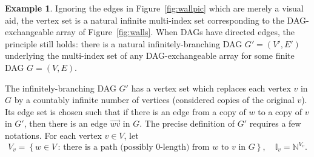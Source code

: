 \documentclass[10pt]{amsart}
\theoremstyle{definition}\newtheorem{defi}[theo]{Definition}\newtheorem{rema}[theo]{Remark}\newtheorem{exam}[theo]{Example}\newtheorem{exem}[theo]{Example}\newtheorem{nota}[theo]{Notation}
\begin{document}
\begin{exam}\label{ex:infdag}
Ignoring the edges in Figure~\ref{fig:wallpic} which are merely a visual aid, the vertex set is a natural infinite multi-index set corresponding to the DAG-exchangeable array of Figure~\ref{fig:walls}. When DAGs have directed edges, the principle still holds: there is a natural infinitely-branching DAG $G'=(V',E')$ underlying the multi-index set of any DAG-exchangeable array for some finite DAG $G=(V,E)$.


The infinitely-branching DAG $G'$ has a vertex set which replaces each vertex $v$ in $G$ by a countably infinite number of vertices (considered copies of the original $v$). Its edge set is chosen such that if there is an edge from a copy of $w$ to a copy of $v$ in $G'$, then there is an edge $\overrightarrow{wv}$ in $G$. The precise definition of $G'$ requires a few notations. For each vertex $v \in V$, let
\[
V_v = \left\{w \in V\,:\,\text{there is a path (possibly 0-length) from } w \text{ to } v \text{ in }G\right\},\quad
\mathbb{I}_v = \mathbb{N}^{V_v}.
\]



\end{exam}
\end{document}

